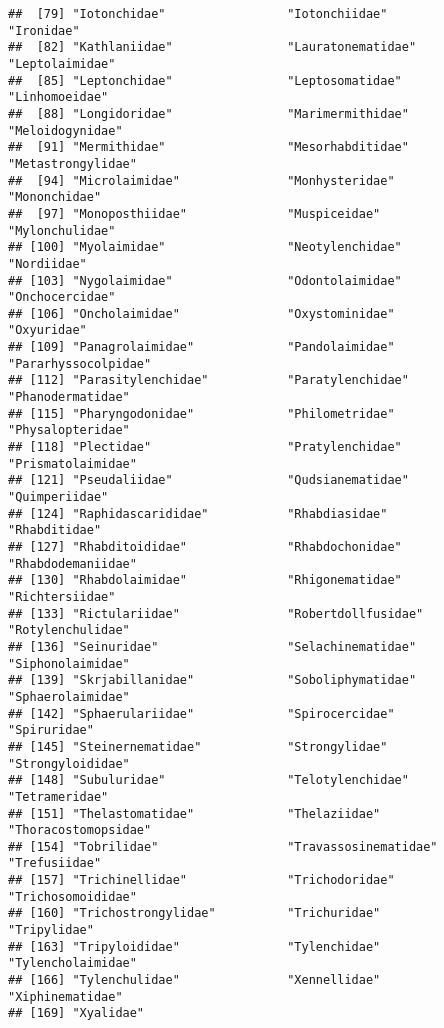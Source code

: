 \documentclass[
]{article}
\begin{document}
\begin{verbatim}
##  [79] "Iotonchidae"                 "Iotonchiidae"                "Ironidae"                   
##  [82] "Kathlaniidae"                "Lauratonematidae"            "Leptolaimidae"              
##  [85] "Leptonchidae"                "Leptosomatidae"              "Linhomoeidae"               
##  [88] "Longidoridae"                "Marimermithidae"             "Meloidogynidae"             
##  [91] "Mermithidae"                 "Mesorhabditidae"             "Metastrongylidae"           
##  [94] "Microlaimidae"               "Monhysteridae"               "Mononchidae"                
##  [97] "Monoposthiidae"              "Muspiceidae"                 "Mylonchulidae"              
## [100] "Myolaimidae"                 "Neotylenchidae"              "Nordiidae"                  
## [103] "Nygolaimidae"                "Odontolaimidae"              "Onchocercidae"              
## [106] "Oncholaimidae"               "Oxystominidae"               "Oxyuridae"                  
## [109] "Panagrolaimidae"             "Pandolaimidae"               "Pararhyssocolpidae"         
## [112] "Parasitylenchidae"           "Paratylenchidae"             "Phanodermatidae"            
## [115] "Pharyngodonidae"             "Philometridae"               "Physalopteridae"            
## [118] "Plectidae"                   "Pratylenchidae"              "Prismatolaimidae"           
## [121] "Pseudaliidae"                "Qudsianematidae"             "Quimperiidae"               
## [124] "Raphidascarididae"           "Rhabdiasidae"                "Rhabditidae"                
## [127] "Rhabditoididae"              "Rhabdochonidae"              "Rhabdodemaniidae"           
## [130] "Rhabdolaimidae"              "Rhigonematidae"              "Richtersiidae"              
## [133] "Rictulariidae"               "Robertdollfusidae"           "Rotylenchulidae"            
## [136] "Seinuridae"                  "Selachinematidae"            "Siphonolaimidae"            
## [139] "Skrjabillanidae"             "Soboliphymatidae"            "Sphaerolaimidae"            
## [142] "Sphaerulariidae"             "Spirocercidae"               "Spiruridae"                 
## [145] "Steinernematidae"            "Strongylidae"                "Strongyloididae"            
## [148] "Subuluridae"                 "Telotylenchidae"             "Tetrameridae"               
## [151] "Thelastomatidae"             "Thelaziidae"                 "Thoracostomopsidae"         
## [154] "Tobrilidae"                  "Travassosinematidae"         "Trefusiidae"                
## [157] "Trichinellidae"              "Trichodoridae"               "Trichosomoididae"           
## [160] "Trichostrongylidae"          "Trichuridae"                 "Tripylidae"                 
## [163] "Tripyloididae"               "Tylenchidae"                 "Tylencholaimidae"           
## [166] "Tylenchulidae"               "Xennellidae"                 "Xiphinematidae"             
## [169] "Xyalidae"
\end{verbatim}
\end{document}
